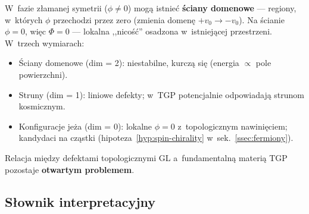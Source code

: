 \begin{remark}\label{rem:GL-defects}
W~fazie z\l{}amanej symetrii ($\phi \neq 0$) mog\k{a} istnie\'c
\textbf{\'sciany domenowe} --- regiony, w~kt\'orych $\phi$
przechodzi przez zero (zmienia domen\k{e} $+v_0 \to -v_0$).
Na \'scianie $\phi = 0$, wi\k{e}c $\Phi = 0$ ---
lokalna ,,nico\'s\'c'' osadzona w~istniej\k{a}cej przestrzeni.
W~trzech wymiarach:
\begin{itemize}[nosep]
  \item \'Sciany domenowe (dim = 2): niestabilne, kurczą się
    (energia $\propto$ pole powierzchni).
  \item Struny (dim = 1): liniowe defekty; w~TGP potencjalnie
    odpowiadaj\k{a} strunom kosmicznym.
  \item Konfiguracje je\.za (dim = 0): lokalne $\phi = 0$
    z~topologicznym nawinięciem; kandydaci na cz\k{a}stki
    (hipoteza~\ref{hyp:spin-chirality} w~sek.~\ref{ssec:fermiony}).
\end{itemize}
Relacja mi\k{e}dzy defektami topologicznymi GL
a~fundamentaln\k{a} materi\k{a} TGP pozostaje
\textbf{otwartym problemem}.
\end{remark}

\subsection{S\l{}ownik interpretacyjny}\label{ssec:slownik-interp}

